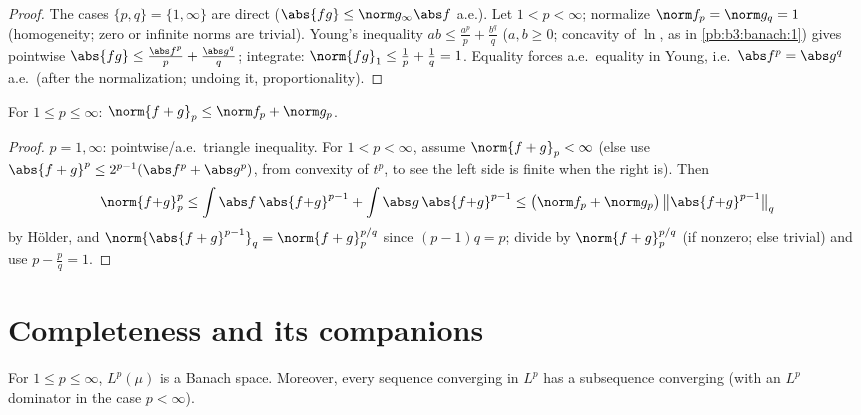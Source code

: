 \begin{proof}
The cases $\{p, q\} = \{1, \infty\}$ are direct ($\abs{fg} \leq
\norm g_\infty\abs f$ a.e.). Let $1 < p < \infty$; normalize
$\norm f_p = \norm g_q = 1$ (homogeneity; zero or infinite
norms are trivial). Young's inequality $ab \leq \frac{a^p}p +
\frac{b^q}q$ ($a, b \geq 0$; concavity of $\ln$, as in
\cref{pb:b3:banach:1}) gives pointwise $\abs{f g} \leq
\frac{\abs f^p}p + \frac{\abs g^q}q$; integrate: $\norm{fg}_1
\leq \frac1p + \frac1q = 1$. Equality forces a.e.\ equality in
Young, i.e.\ $\abs f^p = \abs g^q$ a.e.\ (after the
normalization; undoing it, proportionality).
\end{proof}

\begin{theorem}\label{thm:b3:lp:minkowski}
For $1 \leq p \leq \infty$: $\norm{f + g}_p \leq \norm f_p +
\norm g_p$.
\end{theorem}

\begin{proof}
$p = 1, \infty$: pointwise/a.e.\ triangle inequality. For $1 <
p < \infty$, assume $\norm{f+g}_p < \infty$ (else use
$\abs{f+g}^p \leq 2^{p-1}(\abs f^p + \abs g^p)$, from convexity
of $t^p$, to see the left side is finite when the right is).
Then
\[
\norm{f{+}g}_p^p \leq \int\abs f\,\abs{f{+}g}^{p-1} +
\int\abs g\,\abs{f{+}g}^{p-1}
\leq \bigl(\norm f_p + \norm g_p\bigr)\,
\bigl\|\abs{f{+}g}^{p-1}\bigr\|_q
\]
by H\"older, and $\norm{\abs{f+g}^{p-1}}_q =
\norm{f+g}_p^{p/q}$ since $(p-1)q = p$; divide by
$\norm{f+g}_p^{p/q}$ (if nonzero; else trivial) and use $p -
\frac pq = 1$.
\end{proof}

\section{Completeness and its companions}

\begin{theorem}\label{thm:b3:lp:complete}
For $1 \leq p \leq \infty$, $L^p(\mu)$ is a Banach space.
Moreover, every sequence converging in $L^p$ has a subsequence
converging \emph{} (with an $L^p$ dominator
in the case $p < \infty$).
\end{theorem}

